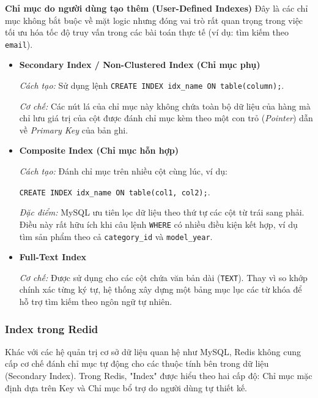 \vspace{1em}

\noindent\textbf{Chỉ mục do người dùng tạo thêm (User-Defined Indexes)} Đây là các chỉ mục không bắt buộc về mặt logic nhưng đóng vai trò rất quan
trọng trong việc tối ưu hóa tốc độ truy vấn trong các bài toán thực tế
(ví dụ: tìm kiếm theo \texttt{email}).

\begin{itemize}

\item \textbf{Secondary Index / Non-Clustered Index (Chỉ mục phụ)}

\textit{Cách tạo:} Sử dụng lệnh 
\texttt{CREATE INDEX idx\_name ON table(column);}.

\textit{Cơ chế:} Các nút lá của chỉ mục này không chứa toàn bộ dữ liệu của
hàng mà chỉ lưu giá trị của cột được đánh chỉ mục kèm theo một con trỏ
(\textit{Pointer}) dẫn về \textit{Primary Key} của bản ghi.


\item \textbf{Composite Index (Chỉ mục hỗn hợp)}

\textit{Cách tạo:} Đánh chỉ mục trên nhiều cột cùng lúc, ví dụ:

\texttt{CREATE INDEX idx\_name ON table(col1, col2);}.

\textit{Đặc điểm:} MySQL ưu tiên lọc dữ liệu theo thứ tự các cột từ trái
sang phải. Điều này rất hữu ích khi câu lệnh \texttt{WHERE} có nhiều điều
kiện kết hợp, ví dụ tìm sản phẩm theo cả \texttt{category\_id} và
\texttt{model\_year}.

\item \textbf{Full-Text Index}

\textit{Cơ chế:} Được sử dụng cho các cột chứa văn bản dài (\texttt{TEXT}).
Thay vì so khớp chính xác từng ký tự, hệ thống xây dựng một bảng mục lục
các từ khóa để hỗ trợ tìm kiếm theo ngôn ngữ tự nhiên.

\end{itemize}

\subsubsection{Index trong Redid}
Khác với các hệ quản trị cơ sở dữ liệu quan hệ như MySQL, Redis không cung cấp cơ chế đánh chỉ mục tự động cho các thuộc tính bên trong dữ liệu (Secondary Index). Trong Redis, "Index" được hiểu theo hai cấp độ: Chỉ mục mặc định dựa trên Key và Chỉ mục bổ trợ do người dùng tự thiết kế.

\vspace{1em}


